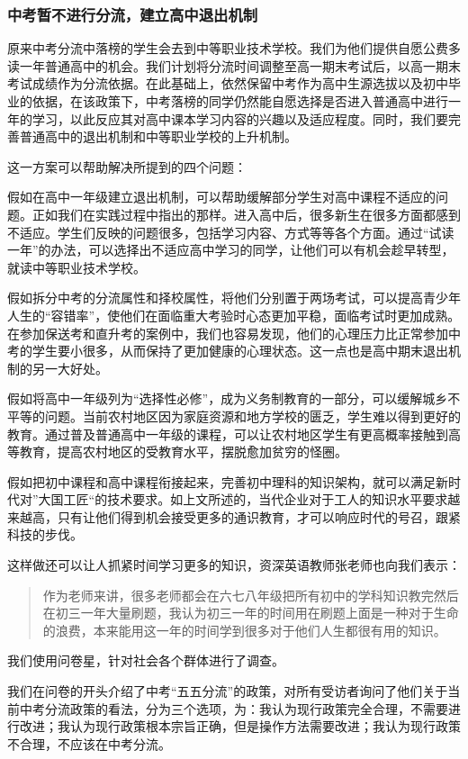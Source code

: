 \documentclass[12pt,UTF8]{ctexart}
\begin{document}
\subsubsection {中考暂不进行分流，建立高中退出机制}
\par {
	
	原来中考分流中落榜的学生会去到中等职业技术学校。我们为他们提供自愿公费多读一年普通高中的机会。我们计划将分流时间调整至高一期末考试后，以高一期末考试成绩作为分流依据。在此基础上，依然保留中考作为高中生源选拔以及初中毕业的依据，在该政策下，中考落榜的同学仍然能自愿选择是否进入普通高中进行一年的学习，以此反应其对高中课本学习内容的兴趣以及适应程度。同时，我们要完善普通高中的退出机制和中等职业学校的上升机制。
}
\par{
	这一方案可以帮助解决所提到的四个问题：
}
\par {
	
	假如在高中一年级建立退出机制，可以帮助缓解部分学生对高中课程不适应的问题。正如我们在实践过程中指出的那样。进入高中后，很多新生在很多方面都感到不适应。学生们反映的问题很多，包括学习内容、方式等等各个方面。通过“试读一年”的办法，可以选择出不适应高中学习的同学，让他们可以有机会趁早转型，就读中等职业技术学校。
}
\par {
	
	假如拆分中考的分流属性和择校属性，将他们分别置于两场考试，可以提高青少年人生的“容错率”，使他们在面临重大考验时心态更加平稳，面临考试时更加成熟。在参加保送考和直升考的案例中，我们也容易发现，他们的心理压力比正常参加中考的学生要小很多，从而保持了更加健康的心理状态。这一点也是高中期末退出机制的另一大好处。
}
\par {
	
	假如将高中一年级列为“选择性必修”，成为义务制教育的一部分，可以缓解城乡不平等的问题。当前农村地区因为家庭资源和地方学校的匮乏，学生难以得到更好的教育。通过普及普通高中一年级的课程，可以让农村地区学生有更高概率接触到高等教育，提高农村地区的受教育水平，摆脱愈加贫穷的怪圈。
}
\par {
	
	假如把初中课程和高中课程衔接起来，完善初中理科的知识架构，就可以满足新时代对”大国工匠“的技术要求。如上文所述的，当代企业对于工人的知识水平要求越来越高，只有让他们得到机会接受更多的通识教育，才可以响应时代的号召，跟紧科技的步伐。
}
\par {
	这样做还可以让人抓紧时间学习更多的知识，资深英语教师张老师也向我们表示：
	\begin{quote}
		\kaishu
		作为老师来讲，很多老师都会在六七八年级把所有初中的学科知识教完然后在初三一年大量刷题，我认为初三一年的时间用在刷题上面是一种对于生命的浪费，本来能用这一年的时间学到很多对于他们人生都很有用的知识。
	\end{quote}
}
\par {
	我们使用问卷星，针对社会各个群体进行了调查。
}
\par {
	
	我们在问卷的开头介绍了中考“五五分流”的政策，对所有受访者询问了他们关于当前中考分流政策的看法，分为三个选项，为：我认为现行政策完全合理，不需要进行改进；我认为现行政策根本宗旨正确，但是操作方法需要改进；我认为现行政策不合理，不应该在中考分流。
}
\end{document}
